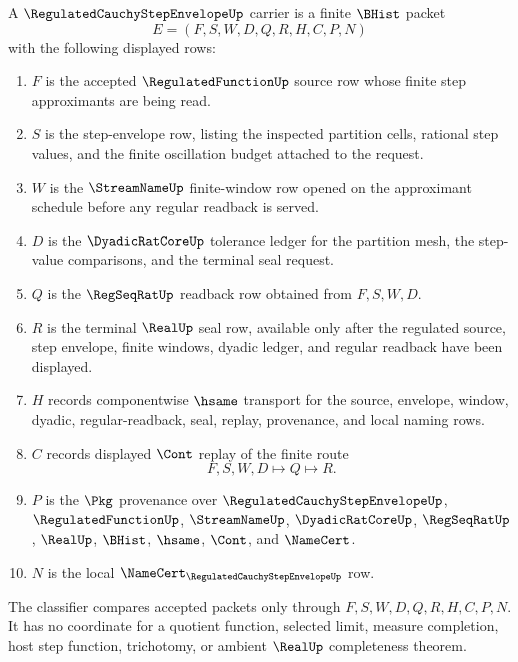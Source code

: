 \begin{definition}
\label{def:regulated-cauchy-step-envelope-carrier}
A $\RegulatedCauchyStepEnvelopeUp$ carrier is a finite $\BHist$ packet
$$
E=(F,S,W,D,Q,R,H,C,P,N)
$$
with the following displayed rows:
\begin{enumerate}
\item $F$ is the accepted $\RegulatedFunctionUp$ source row whose finite step approximants are being read.
\item $S$ is the step-envelope row, listing the inspected partition cells, rational step values, and the finite oscillation budget attached to the request.
\item $W$ is the $\StreamNameUp$ finite-window row opened on the approximant schedule before any regular readback is served.
\item $D$ is the $\DyadicRatCoreUp$ tolerance ledger for the partition mesh, the step-value comparisons, and the terminal seal request.
\item $Q$ is the $\RegSeqRatUp$ readback row obtained from $F,S,W,D$.
\item $R$ is the terminal $\RealUp$ seal row, available only after the regulated source, step envelope, finite windows, dyadic ledger, and regular readback have been displayed.
\item $H$ records componentwise $\hsame$ transport for the source, envelope, window, dyadic, regular-readback, seal, replay, provenance, and local naming rows.
\item $C$ records displayed $\Cont$ replay of the finite route
$$
F,S,W,D \longmapsto Q \longmapsto R .
$$
\item $P$ is the $\Pkg$ provenance over $\RegulatedCauchyStepEnvelopeUp$, $\RegulatedFunctionUp$, $\StreamNameUp$, $\DyadicRatCoreUp$, $\RegSeqRatUp$, $\RealUp$, $\BHist$, $\hsame$, $\Cont$, and $\NameCert$.
\item $N$ is the local $\NameCert_{\RegulatedCauchyStepEnvelopeUp}$ row.
\end{enumerate}
The classifier compares accepted packets only through $F,S,W,D,Q,R,H,C,P,N$. It has no coordinate for a quotient function, selected limit, measure completion, host step function, trichotomy, or ambient $\RealUp$ completeness theorem.
\end{definition}

